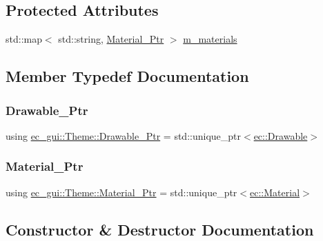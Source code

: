\subsection*{Protected Attributes}
\begin{DoxyCompactItemize}
\item 
std\+::map$<$ std\+::string, \mbox{\hyperlink{classec__gui_1_1_theme_a11b77ff5a6cc1076926894595d564b96}{Material\+\_\+\+Ptr}} $>$ \mbox{\hyperlink{classec__gui_1_1_theme_a487d27c57cc712153f02a8cf30667e9c}{m\+\_\+materials}}
\end{DoxyCompactItemize}


\subsection{Member Typedef Documentation}
\mbox{\label{classec__gui_1_1_theme_aa831418117dca2cf1b0c390bd0da97c1}} 
\subsubsection{\texorpdfstring{Drawable\+\_\+\+Ptr}{Drawable\_Ptr}}
{\footnotesize\ttfamily using \mbox{\hyperlink{classec__gui_1_1_theme_aa831418117dca2cf1b0c390bd0da97c1}{ec\+\_\+gui\+::\+Theme\+::\+Drawable\+\_\+\+Ptr}} =  std\+::unique\+\_\+ptr$<$\mbox{\hyperlink{classec_1_1_drawable}{ec\+::\+Drawable}}$>$}

\mbox{\label{classec__gui_1_1_theme_a11b77ff5a6cc1076926894595d564b96}} 
\subsubsection{\texorpdfstring{Material\+\_\+\+Ptr}{Material\_Ptr}}
{\footnotesize\ttfamily using \mbox{\hyperlink{classec__gui_1_1_theme_a11b77ff5a6cc1076926894595d564b96}{ec\+\_\+gui\+::\+Theme\+::\+Material\+\_\+\+Ptr}} =  std\+::unique\+\_\+ptr$<$\mbox{\hyperlink{classec_1_1_material}{ec\+::\+Material}}$>$}



\subsection{Constructor \& Destructor Documentation}
\mbox{\label{classec__gui_1_1_theme_ad0a0cf74a37307bdb2cc12672f2649d4}} 
